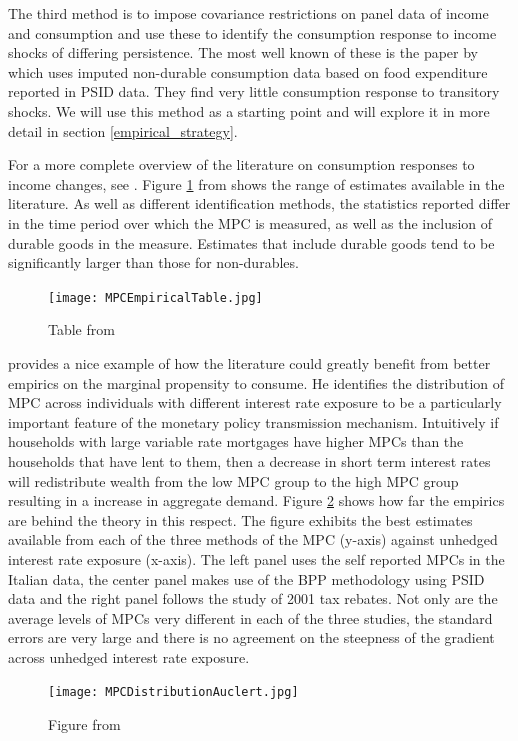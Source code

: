\documentclass[titlepage]{\econtex}\newcommand{\texname}{IncomeUncertainty}
\begin{document}
The third method is to impose covariance restrictions on panel data of income and consumption and use these to identify the consumption response to income shocks of differing persistence. The most well known of these is the paper by \cite{blundell_consumption_2008} which uses imputed non-durable consumption data based on food expenditure reported in PSID data. They find very little consumption response to transitory shocks. We will use this method as a starting point and will explore it in more detail in section \ref{empirical_strategy}.

For a more complete overview of the literature on consumption responses to income changes, see \cite{jappelli_consumption_2010}. Figure \ref{fig:MPCtable} from \cite{carroll_distribution_2016} shows the range of estimates available in the literature. As well as different identification methods, the statistics reported differ in the time period over which the MPC is measured, as well as the inclusion of durable goods in the measure. Estimates that include durable goods tend to be significantly larger than those for non-durables.
	\begin{figure} 
	\begin{centering}
	\texttt{[image: MPCEmpiricalTable.jpg]}
	\caption{Table from \cite{carroll_distribution_2016}}
	\label{fig:MPCtable}
	\end{centering}
	\end{figure}
\cite{auclert_monetary_2015} provides a nice example of how the literature could greatly benefit from better empirics on the marginal propensity to consume. He identifies the distribution of MPC across individuals with different interest rate exposure to be a particularly important feature of the monetary policy transmission mechanism. Intuitively if households with large variable rate mortgages have higher MPCs than the households that have lent to them, then a decrease in short term interest rates will redistribute wealth from the low MPC group to the high MPC group resulting in a increase in aggregate demand. Figure \ref{fig:Auclert} shows how far the empirics are behind the theory in this respect. The figure exhibits the best estimates available from each of the three methods of the MPC (y-axis) against unhedged interest rate exposure (x-axis). The left panel uses the self reported MPCs in the Italian data, the center panel makes use of the BPP methodology using PSID data and the right panel follows the \cite{johnson_household_2006} study of 2001 tax rebates. Not only are the average levels of MPCs very different in each of the three studies, the standard errors are very large and there is no agreement on the steepness of the gradient across unhedged interest rate exposure.
	\begin{figure} 
	\begin{centering}
	\texttt{[image: MPCDistributionAuclert.jpg]}
	\caption{Figure from \cite{auclert_monetary_2015}}
	\label{fig:Auclert}
	\end{centering}
	\end{figure}
\end{document}
